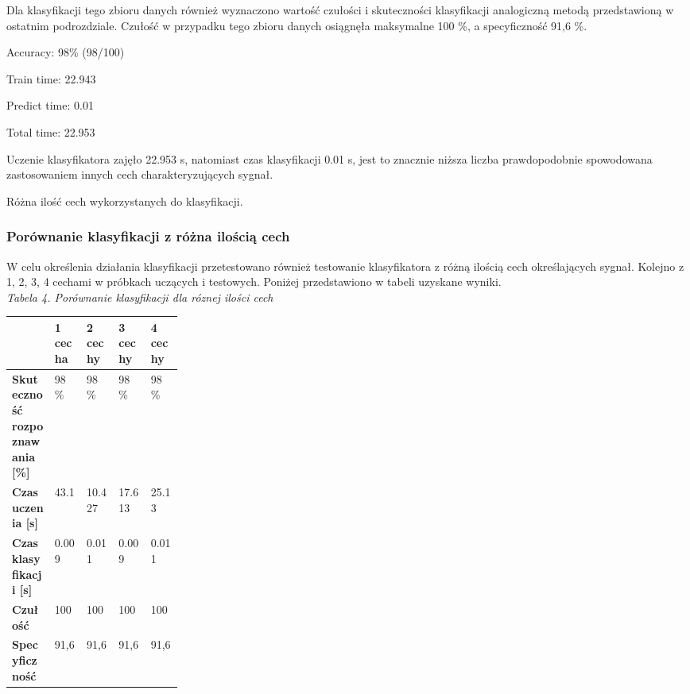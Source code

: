 \documentclass[[10pt,a4paper]{article}
\begin{document}
\begin{enumerate}
\noindent Dla klasyfikacji tego zbioru danych również wyznaczono wartość czułości i skuteczności klasyfikacji analogiczną metodą przedstawioną w ostatnim podrozdziale. Czułość w przypadku tego zbioru danych osiągnęła maksymalne 100 \%, a specyficzność 91,6 \%.

\noindent Accuracy: 98\% (98/100)

\noindent Train time:     22.943

\noindent Predict time:   0.01

\noindent Total time:     22.953

\noindent Uczenie klasyfikatora zajęło 22.953 s, natomiast czas klasyfikacji 0.01 s, jest to znacznie niższa liczba prawdopodobnie spowodowana zastosowaniem innych cech charakteryzujących sygnał. 

\noindent Różna ilość cech wykorzystanych do klasyfikacji.

\noindent 

\noindent 

\subsubsection{Porównanie klasyfikacji z różna ilością cech} 
\noindent W celu określenia działania klasyfikacji przetestowano również testowanie klasyfikatora z różną ilością cech określających sygnał. Kolejno z 1, 2, 3, 4 cechami w próbkach uczących i testowych. Poniżej przedstawiono w tabeli uzyskane wyniki.\\
\textit{ Tabela 4. Porównanie klasyfikacji dla róznej ilości cech}
\newline
\begin{tabular}{|p{0.25\linewidth}|p{0.8in}|p{0.8in}|p{0.8in}|p{0.8in}|} \hline 
 & \textbf{1 cecha} & \textbf{2 cechy} & \textbf{3 cechy} & \textbf{4 cechy} \\ \hline 
\textbf{Skuteczność rozpoznawania [\%]} & 98 \% & 98 \% & 98 \% & 98 \% \\ \hline 
\textbf{Czas uczenia [s]} & 43.1 & 10.427 & 17.613 & 25.13 \\ \hline 
\textbf{Czas klasyfikacji [s]} & 0.009 & 0.011 & 0.009 & 0.011 \\ \hline 
\textbf{Czułość} & 100 & 100 & 100 & 100 \\ \hline 
\textbf{Specyficzność} & 91,6 & 91,6 & 91,6 & 91,6 \\ \hline 
\end{tabular}\\




\end{enumerate}
\end{document}
